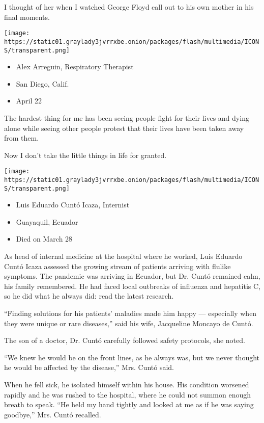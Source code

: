 I thought of her when I watched George Floyd call out to his own mother
in his final moments.

\texttt{[image: https://static01.graylady3jvrrxbe.onion/packages/flash/multimedia/ICONS/transparent.png]}

\begin{itemize}
\tightlist
\item
  Alex Arreguin, Respiratory Therapist
\item
  San Diego, Calif.
\item
  April 22
\end{itemize}

The hardest thing for me has been seeing people fight for their lives
and dying alone while seeing other people protest that their lives have
been taken away from them.

Now I don't take the little things in life for granted.

\texttt{[image: https://static01.graylady3jvrrxbe.onion/packages/flash/multimedia/ICONS/transparent.png]}

\begin{itemize}
\tightlist
\item
  Luis Eduardo Cuntó Icaza, Internist
\item
  Guayaquil, Ecuador
\item
  Died on March 28
\end{itemize}

As head of internal medicine at the hospital where he worked, Luis
Eduardo Cuntó Icaza assessed the growing stream of patients arriving
with flulike symptoms. The pandemic was arriving in Ecuador, but Dr.
Cuntó remained calm, his family remembered. He had faced local outbreaks
of influenza and hepatitis C, so he did what he always did: read the
latest research.

``Finding solutions for his patients' maladies made him happy ---
especially when they were unique or rare diseases,'' said his wife,
Jacqueline Moncayo de Cuntó.

The son of a doctor, Dr. Cuntó carefully followed safety protocols, she
noted.

``We knew he would be on the front lines, as he always was, but we never
thought he would be affected by the disease,'' Mrs. Cuntó said.

When he fell sick, he isolated himself within his house. His condition
worsened rapidly and he was rushed to the hospital, where he could not
summon enough breath to speak. ``He held my hand tightly and looked at
me as if he was saying goodbye,'' Mrs. Cuntó recalled.

